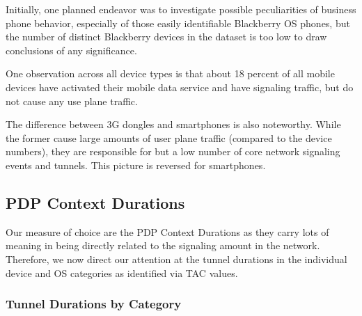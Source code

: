 
Initially, one planned endeavor was to investigate possible peculiarities of business phone behavior, especially of those easily identifiable Blackberry OS phones, but the number of distinct Blackberry devices in the dataset is too low to draw conclusions of any significance.

One observation across all device types is that about 18 percent of all mobile devices have activated their mobile data service and have signaling traffic, but do not cause any use plane traffic.

The difference between 3G dongles and smartphones is also noteworthy. While the former cause large amounts of user plane traffic (compared to the device numbers), they are responsible for but a low number of core network signaling events and tunnels. This picture is reversed for smartphones.





\subsection{PDP Context Durations}

Our measure of choice are the PDP Context Durations as they carry lots of meaning in being directly related to the signaling amount in the network. Therefore, we now direct our attention at the tunnel durations in the individual device and OS categories as identified via \ac{TAC} values.


\subsubsection{Tunnel Durations by Category}


